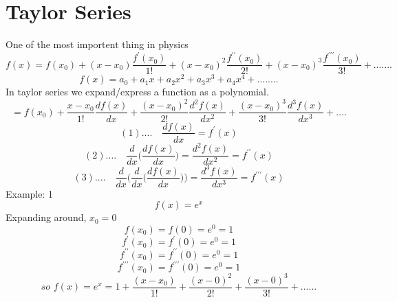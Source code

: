 \section{Taylor Series}

One of the most importent thing in physics
\begin{equation}
f(x) = f(x_0)+(x-x_0)\frac{f^\prime(x_0)}{1!}+(x-x_0)^2\frac{f^{\prime\prime}(x_0)}{2!}+(x-x_0)^3\frac{f^{\prime\prime\prime}(x_0)}{3!}+.......
\end{equation}
\begin{equation}
f(x) = a_0+a_1x+a_2x^2+a_3x^3+a_4x^4+........
\end{equation}
In taylor series we expand/express a function as a polynomial.
\newline
\begin{equation}
= f(x_0)+\frac{x-x_0}{1!}\frac{df(x)}{dx}+\frac{(x-x_0)^2}{2!}\frac{d^2f(x)}{dx^2}+\frac{(x-x_0)^3}{3!}\frac{d^3f(x)}{dx^3}+....
\end{equation}
\begin{equation}
(1).... \quad \frac{df(x)}{dx} = f^\prime(x)
\end{equation}
\begin{equation}
(2).... \quad \frac{d}{dx}\bigg(\frac{df(x)}{dx}\bigg) = \frac{d^2f(x)}{dx^2} = f^{\prime\prime}(x)
\end{equation}
\begin{equation}
(3).... \quad \frac{d}{dx}\bigg(\frac{d}{dx}\bigg(\frac{df(x)}{dx}\bigg)\bigg) = \frac{d^3f(x)}{dx^3} = f^{\prime\prime\prime}(x)
\end{equation}
\newpage
Example: 1
\begin{displaymath}
f(x) = e^x
\end{displaymath}
Expanding around, $ x_0 = 0 $	
\begin{displaymath}
f(x_0) = f(0) = e^0=1
\end{displaymath}
\begin{displaymath}
f^\prime(x_0)=f^\prime(0)=e^0=1
\end{displaymath}
\begin{displaymath}
f^{\prime\prime}(x_0)=f^{\prime\prime}(0)=e^0=1
\end{displaymath}
\begin{displaymath}
f^{\prime\prime\prime}(x_0)=f^{\prime\prime\prime}(0)=e^0=1
\end{displaymath}
\begin{displaymath}
so \,\, f(x) = e^x=1+\frac{(x-x_0)}{1!}+\frac{(x-0)^2}{2!}+\frac{(x-0)^3}{3!}+......
\end{displaymath}
